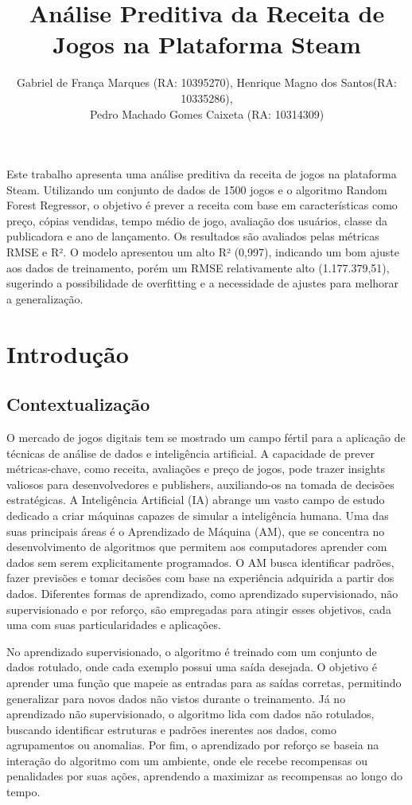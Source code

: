 \documentclass[12pt]{article}
\title{Análise Preditiva da Receita de Jogos na Plataforma Steam}
\author{Gabriel de França Marques (RA: 10395270)\inst{1}, Henrique Magno dos Santos(RA: 10335286)\inst{1}, \\ 
Pedro Machado Gomes Caixeta (RA: 10314309)\inst{1}}
\begin{document}
 

\maketitle

\begin{resumo}
Este trabalho apresenta uma análise preditiva da receita de jogos na plataforma Steam. Utilizando um conjunto de dados de 1500 jogos e o algoritmo Random Forest Regressor, o objetivo é prever a receita com base em características como preço, cópias vendidas, tempo médio de jogo, avaliação dos usuários, classe da publicadora e ano de lançamento. Os resultados são avaliados pelas métricas RMSE e R². O modelo apresentou um alto R² (0,997), indicando um bom ajuste aos dados de treinamento, porém um RMSE relativamente alto (1.177.379,51), sugerindo a possibilidade de overfitting e a necessidade de ajustes para melhorar a generalização.
\end{resumo}


\section{Introdução}
\subsection{Contextualização} \label{sec:contextualizacao}

O mercado de jogos digitais tem se mostrado um campo fértil para a aplicação de técnicas de análise de dados e inteligência artificial. A capacidade de prever métricas-chave, como receita, avaliações e preço de jogos, pode trazer insights valiosos para desenvolvedores e publishers, auxiliando-os na tomada de decisões estratégicas. A Inteligência Artificial (IA) abrange um vasto campo de estudo dedicado a criar máquinas capazes de simular a inteligência humana. Uma das suas principais áreas é o Aprendizado de Máquina (AM), que se concentra no desenvolvimento de algoritmos que permitem aos computadores aprender com dados sem serem explicitamente programados. O AM busca identificar padrões, fazer previsões e tomar decisões com base na experiência adquirida a partir dos dados. Diferentes formas de aprendizado, como aprendizado supervisionado, não supervisionado e por reforço, são empregadas para atingir esses objetivos, cada uma com suas particularidades e aplicações. \cite{iaabordagem}

No aprendizado supervisionado, o algoritmo é treinado com um conjunto de dados rotulado, onde cada exemplo possui uma saída desejada. O objetivo é aprender uma função que mapeie as entradas para as saídas corretas, permitindo generalizar para novos dados não vistos durante o treinamento. Já no aprendizado não supervisionado, o algoritmo lida com dados não rotulados, buscando identificar estruturas e padrões inerentes aos dados, como agrupamentos ou anomalias. Por fim, o aprendizado por reforço se baseia na interação do algoritmo com um ambiente, onde ele recebe recompensas ou penalidades por suas ações, aprendendo a maximizar as recompensas ao longo do tempo. \cite{iaabordagem}
\end{document}
